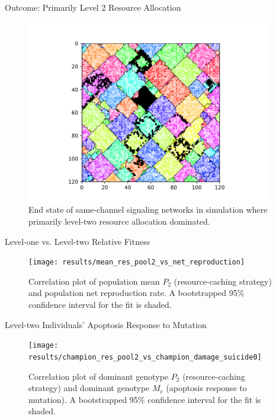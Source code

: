 \begin{frame}{Outcome: Primarily Level 2 Resource Allocation}
\begin{figure}
\begin{columns}
\begin{column}{0.6\textwidth}
\includegraphics[width=\textwidth,trim={2.5cm 0 2.5cm 0},clip]{img/results/ChannelMap_1019_update24995104}
\end{column}
\begin{column}{0.4\textwidth}
\caption{
End state of same-channel signaling networks in simulation where primarily level-two resource allocation dominated.
}
\end{column}
\end{columns}
\end{figure}
\end{frame}

\begin{frame}{Level-one vs. Level-two Relative Fitness}

\begin{figure}
\texttt{[image: results/mean\_res\_pool2\_vs\_net\_reproduction]}
\caption{
Correlation plot of population mean $P_2$ (resource-caching strategy) and population net reproduction rate.
A bootstrapped 95\% confidence interval for the fit is shaded.
}
\end{figure}

\end{frame}

\begin{frame}{Level-two Individuals' Apoptosis Response to Mutation}

\begin{figure}
\texttt{[image: results/champion\_res\_pool2\_vs\_champion\_damage\_suicide0]}
\caption{
Correlation plot of dominant genotype $P_2$ (resource-caching strategy) and dominant genotype $M_{c}$ (apoptosis response to mutation).
A bootstrapped 95\% confidence interval for the fit is shaded.
}
\end{figure}

\end{frame}
